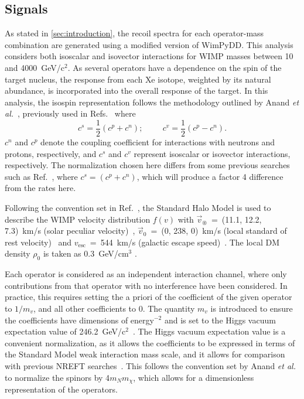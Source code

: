 \documentclass[reprint, showpacs,
preprintnumbers,
amsmath,amssymb,
aps, floatfix,
superscriptaddress,
prd, nofootinbib]{revtex4-1}
\begin{document}
\subsection{\label{subsec:signal}Signals}
\par
As stated in \autoref{sec:introduction}, the recoil spectra for each operator-mass combination are generated using a modified version of WimPyDD. 
This analysis considers both isoscalar and isovector interactions for WIMP masses between 10 and 4000~GeV/c$^2$.
As several operators have a dependence on the spin of the target nucleus, the response from each Xe isotope, weighted by its natural abundance, is incorporated into the overall response of the target.  
In this analysis, the isospin representation follows the methodology outlined by Anand \textit{et al.}~\cite{Anand:MathematicaEFT}, previously used in Refs.~\cite{PandaX2:SD_EFT_2019, Xenon100:EFT_2017} where
\begin{equation}
    c^{s} = \frac{1}{2} (c^{p} + c^{n}); \hspace{1cm} c^v = \frac{1}{2}(c^p - c^n).
\end{equation}
$c^n$ and $c^p$ denote the coupling coefficient for interactions with neutrons and protons, respectively, and $c^s$ and $c^v$ represent isoscalar or isovector interactions, respectively.
The normalization chosen here differs from some previous searches such as Ref.~\cite{LUX:EFTR4_2021}, where $c^{s} = (c^p + c^n)$, which will produce a factor 4 difference from the rates here.
\par
Following the convention set in Ref.~\cite{DM_parameters:BAXTER2021_Conventions}, the Standard Halo Model is used to describe the WIMP velocity distribution $f(v)$ with $\vec{v}_\circledast$~=~(11.1, 12.2, 7.3)~km/s (solar peculiar velocity)~\cite{Schoenrich:Local_kinematics}, $\vec{v}_0$~=~(0, 238, 0)~km/s (local standard of rest velocity)~\cite{DM_parameters:galaxy_context_rest_velocity_1, DM_parameters:galaxy_context_rest_velocity_2} and $v_{\text{esc}}$~=~544~km/s (galactic escape speed)~\cite{DM_parameters:RAVE_survey_escape_velocity}. 
The local DM density $\rho_0$ is taken as 0.3~GeV/cm$^3$ \cite{DM_parameters:LEWIN199687_DM_density}. 
\par
Each operator is considered as an independent interaction channel, where only contributions from that operator with no interference have been considered. 
In practice, this requires setting the a priori of the coefficient of the given operator to $1/m_v$, and all other coefficients to 0. 
The quantity $m_v$ is introduced to ensure the coefficients have dimensions of energy$^{-2}$ and is set to the Higgs vacuum expectation value of 246.2~GeV/c$^2$~\cite{Fitzpatrick:EFT}. 
The Higgs vacuum expectation value is a convenient normalization, as it allows the coefficients to be expressed in terms of the Standard Model weak interaction mass scale, and it allows for comparison with previous NREFT searches~\cite{LUX:EFTR4_2021,Xenon100:EFT_2017}.
This follows the convention set by Anand \textit{et al.}~\cite{Anand:MathematicaEFT} to normalize the spinors by 4$m_N m_\chi$, which allows for a dimensionless representation of the operators. 
\end{document}
